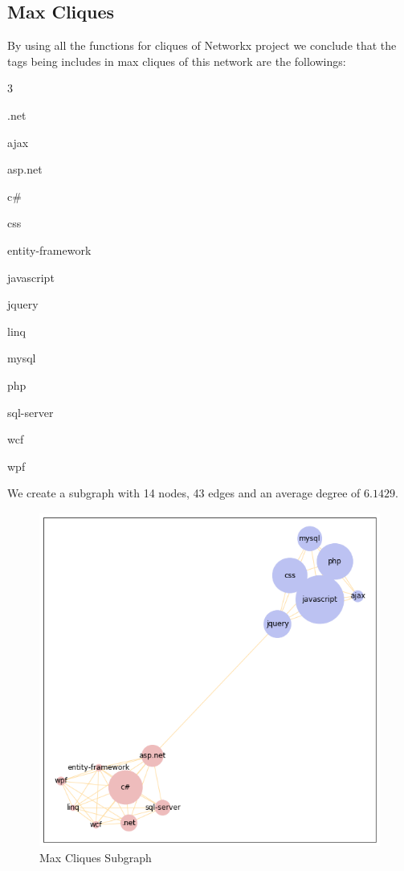 \documentclass[12pt]{article}
\begin{document}
				\subsection{Max Cliques}
				 By using all the functions for cliques of Networkx project we conclude that the tags being includes in max cliques of this network are the followings:
				 \begin{enumerate}
				 \end{enumerate}
			 We create a subgraph with 14 nodes, 43 edges and an average degree of $6.1429$. 
			 					\begin{figure}[ht]
			 	\centering
			 	\includegraphics[width=12cm,height=11cm]{subgraph}
			 	\caption{Max Cliques Subgraph}
			 \end{figure}
			 \FloatBarrier
				 
\end{document}
